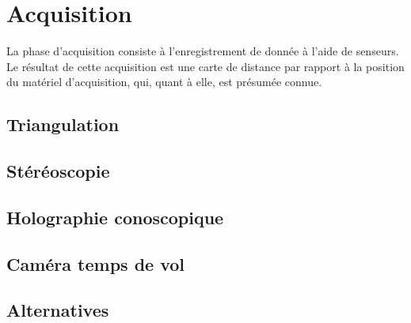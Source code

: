 \section{Acquisition \label{sec:acquisition}}
La phase d'acquisition consiste à l'enregistrement de donnée à l'aide de senseurs. Le résultat de cette acquisition est une carte de distance par rapport à la position du matériel d'acquisition, qui, quant à elle, est présumée connue.
\subsection{Triangulation}



\subsection{Stéréoscopie}

\subsection{Holographie conoscopique}

\subsection{Caméra temps de vol}

\subsection{Alternatives}
